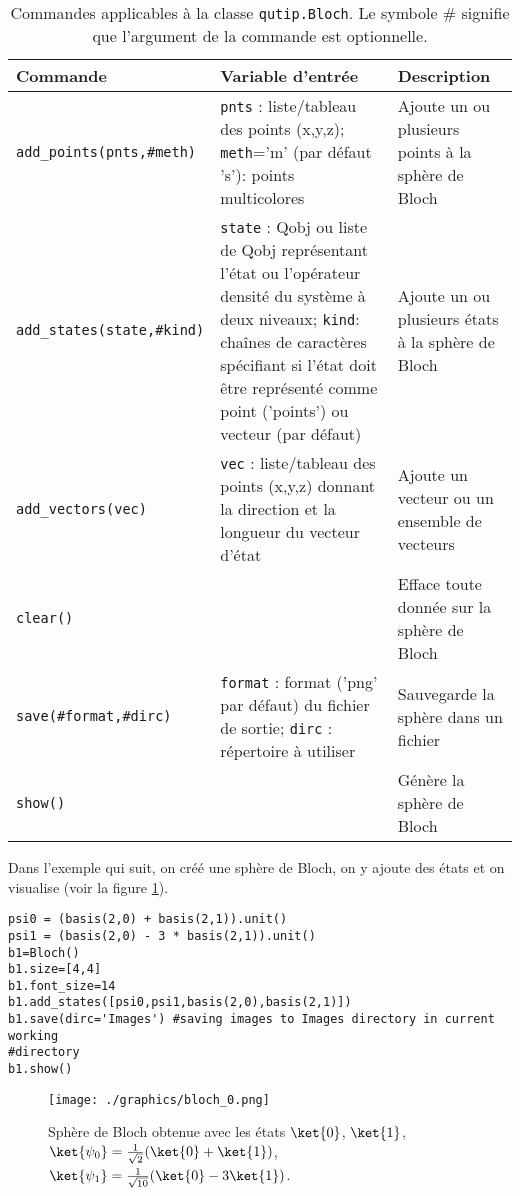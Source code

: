\begin{table}[htp]
\centering
\begin{tabular}{|l|p{5.5cm}|p{4.5cm}|}\hline \hline
\textbf{Commande} & \textbf{Variable d'entrée} & \textbf{Description} \\ \hline 
\hline
\texttt{add\_points(pnts,\#meth)} & \texttt{pnts} : liste/tableau des 
points (x,y,z); \texttt{meth}='m' (par défaut 's'): points multicolores & 
Ajoute un ou plusieurs points à la sphère de Bloch \\ \hline
\texttt{add\_states(state,\#kind)} & \texttt{state} : Qobj ou liste de Qobj 
représentant l'état ou l'opérateur densité du système à deux niveaux;  
\texttt{kind}: chaînes de caractères spécifiant si l'état doit 
être représenté comme point ('points') ou vecteur (par défaut)&  Ajoute un ou 
plusieurs états à la sphère de Bloch \\ \hline
\texttt{add\_vectors(vec)} & \texttt{vec} : liste/tableau des points 
(x,y,z) donnant la direction et la longueur du vecteur d'état & 
Ajoute un vecteur ou un ensemble de vecteurs \\ \hline
\texttt{clear()} & & Efface toute donnée sur la sphère de Bloch \\ \hline
\texttt{save(\#format,\#dirc)} & \texttt{format} : format ('png' par défaut) du 
fichier de sortie; \texttt{dirc} : répertoire à utiliser & Sauvegarde la sphère 
 dans un fichier \\ \hline
\texttt{show()} & & Génère la sphère de Bloch\\ \hline
\end{tabular}
\caption{Commandes applicables à la classe \texttt{qutip.Bloch}. Le symbole \# 
signifie que l'argument de la commande est optionnelle.}
\label{tab:Bloch}
\end{table}

Dans l'exemple qui suit, on créé une sphère de Bloch, on y ajoute des 
états et on visualise (voir la figure \ref{fig:bloch_0}).\\
\begin{lstlisting}[commentstyle=\scriptsize]
psi0 = (basis(2,0) + basis(2,1)).unit()
psi1 = (basis(2,0) - 3 * basis(2,1)).unit()
b1=Bloch()
b1.size=[4,4]
b1.font_size=14
b1.add_states([psi0,psi1,basis(2,0),basis(2,1)])
b1.save(dirc='Images') #saving images to Images directory in current working 
#directory
b1.show()
\end{lstlisting}
\begin{figure}[htbp]
\centering
 \texttt{[image: ./graphics/bloch\_0.png]}
 \caption{Sphère de Bloch obtenue avec les états $\ket{0}$, $\ket{1}$, 
$\ket{\psi_0}=\frac{1}{\sqrt{2}}(\ket{0}+\ket{1})$, 
$\ket{\psi_1}=\frac{1}{\sqrt{10}}(\ket{0}-3\ket{1})$.}
 \label{fig:bloch_0}
\end{figure}

